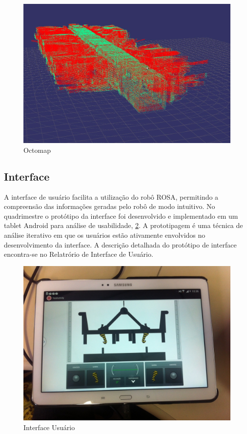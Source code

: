 \begin{figure}[ht!]
    \centering \includegraphics[width=1\columnwidth]{figs/resultados/octomap}
    \caption{Octomap}
    \label{fig:octomap}
\end{figure}

\noindent
\subsection{Interface}

A interface de usuário facilita a utilização do robô ROSA, permitindo a compreensão das informações geradas pelo robô de modo intuitivo. 
No quadrimestre o protótipo da interface foi desenvolvido e implementado em um tablet Android para análise de usabilidade, \ref{fig:userinterface}.   
A prototipagem é uma técnica de análise iterativo em que os usuários estão ativamente envolvidos no desenvolvimento da interface. 
A descrição detalhada do protótipo de interface encontra-se no Relatrório de Interface de Usuário.

\begin{figure}[ht!]
    \centering \includegraphics[width=1\columnwidth]{figs/resultados/UI}
    \caption{Interface Usuário}
    \label{fig:userinterface}
\end{figure}

